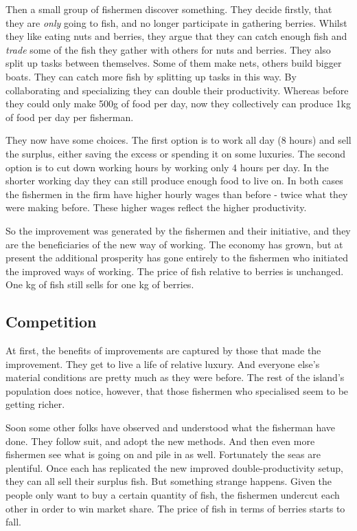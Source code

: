 \documentclass[]{tufte-handout}
\begin{document}
Then a small group of fishermen discover something. They decide firstly,
that they are \emph{only} going to fish, and no longer participate in
gathering berries. Whilst they like eating nuts and berries, they argue
that they can catch enough fish and \emph{trade} some of the fish they
gather with others for nuts and berries. They also split up tasks
between themselves. Some of them make nets, others build bigger boats.
They can catch more fish by splitting up tasks in this way. By
collaborating and specializing they can double their productivity.
Whereas before they could only make 500g of food per day, now they
collectively can produce 1kg of food per day per fisherman.

They now have some choices. The first option is to work all day (8
hours) and sell the surplus, either saving the excess or spending it on
some luxuries. The second option is to cut down working hours by working
only 4 hours per day. In the shorter working day they can still produce
enough food to live on. In both cases the fishermen in the firm have
higher hourly wages than before - twice what they were making before.
These higher wages reflect the higher productivity.

So the improvement was generated by the fishermen and their initiative,
and they are the beneficiaries of the new way of working. The economy
has grown, but at present the additional prosperity has gone entirely to
the fishermen who initiated the improved ways of working. The price of
fish relative to berries is unchanged. One kg of fish still sells for
one kg of berries.

\hypertarget{competition}{%
\subsection{Competition}\label{competition}}

At first, the benefits of improvements are captured by those that made
the improvement. They get to live a life of relative luxury. And
everyone else's material conditions are pretty much as they were before.
The rest of the island's population does notice, however, that those
fishermen who specialised seem to be getting richer.

Soon some other folks have observed and understood what the fisherman
have done. They follow suit, and adopt the new methods. And then even
more fishermen see what is going on and pile in as well. Fortunately the
seas are plentiful. Once each has replicated the new improved
double-productivity setup, they can all sell their surplus fish. But
something strange happens. Given the people only want to buy a certain
quantity of fish, the fishermen undercut each other in order to win
market share. The price of fish in terms of berries starts to fall.
\end{document}

